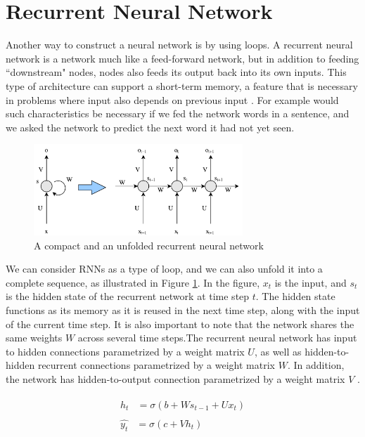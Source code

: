 
\section{Recurrent Neural Network}
Another way to construct a neural network is by using loops. A recurrent neural network \citep{rumelhart1988learning} is a network much like a feed-forward network, but in addition to feeding ``downstream" nodes, nodes also feeds its output back into its own inputs. This type of architecture can support a short-term memory, a feature that is necessary in problems where input also depends on previous input \citep{russell2010aimodernapproach}. For example would such characteristics be necessary if we fed the network words in a sentence, and we asked the network to predict the next word it had not yet seen. 

\begin{figure}[ht]
    \centering
    \includegraphics[width=0.7\textwidth]{fig/related_work/nn_recurrent.pdf}
    \caption{A compact and an unfolded recurrent neural network}
    \label{fig:nn-rnn}
\end{figure}

We can consider RNNs as a type of loop, and we can also unfold it into a complete sequence, as illustrated in Figure \ref{fig:nn-rnn}. In the figure, \(x_{t}\) is the input, and \(s_{t}\) is the hidden state of the recurrent network at time step \(t\). The hidden state functions as its memory as it is reused in the next time step, along with the input of the current time step. It is also important to note that the network shares the same weights \(W\) across several time steps.The recurrent neural network has input to hidden connections parametrized by a weight matrix \(U\), as well as hidden-to-hidden recurrent connections parametrized by a weight matrix \(W\). In addition, the network has hidden-to-output connection parametrized by a weight matrix \(V\) \citep{goodfellow2016deeplearning}.

\begin{align}
    \begin{split}\label{eq:rnn-eq-1}
        h_{t}&=\sigma(b+Ws_{t-1}+Ux_{t})
    \end{split}\\
    \begin{split}\label{eq:rnn-eq-2}
        \hat{y_{t}}&=\sigma(c+Vh_{t})
    \end{split}
\end{align}

